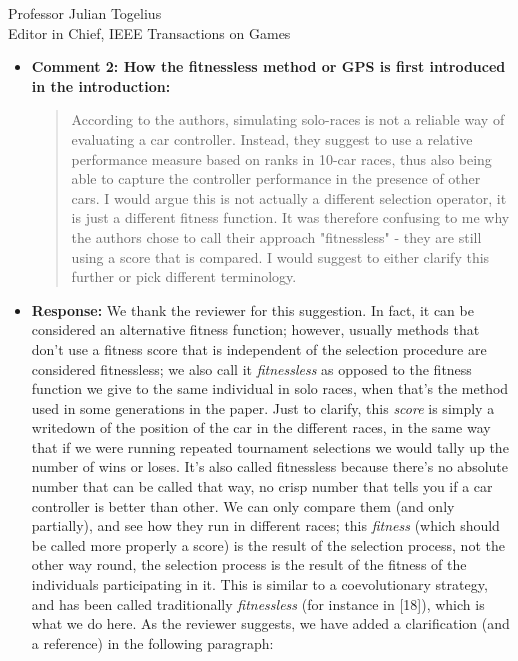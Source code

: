 \documentclass[10pt]{letter} %
\begin{document}
\begin{letter}{Professor Julian Togelius \\ Editor in Chief, IEEE Transactions on Games}
\begin{enumerate}
\begin{itemize}
		\item {\bf  Comment 2:  How the fitnessless method or GPS is first introduced in the introduction:\\
			                \begin{quote}
				According to the authors, simulating solo-races is
				not a reliable way of evaluating a car
				controller. Instead, they suggest to use a relative
				performance measure based on ranks in 10-car races,
				thus also being able to capture the controller
				performance in the presence of other cars. I would
				argue this is not actually a different selection
				operator, it is just a different fitness function. It
				was therefore confusing to me why the authors chose
				to call their approach "fitnessless" - they are still
				using a score that is compared. I would suggest to
				either clarify this further or pick different
				terminology.
			\end{quote}}
			\item {\bf Response:}
		We thank the reviewer for this suggestion. In fact, it can be
		considered an alternative fitness function; however, usually methods that don't use a fitness score that is independent of the selection procedure are considered fitnessless; we also call it {\em fitnessless} as opposed to the fitness function we give to the same individual in solo races, when that's the method used in some generations in the paper. Just to clarify, this {\em score} is simply a writedown of the position of the car in the different races, in the
		same way that if we were running repeated tournament selections we would tally up the number of wins or loses. It's also called fitnessless because there's no absolute number that can be called that way, no crisp number that tells you if a car controller is better than other. We can only compare them (and only partially), and see how they
		run in different races; this {\em fitness} (which should be called more properly a score) is the result of the selection process, not the other way round, the selection process is the result of the fitness of the individuals participating in it. This is similar to a coevolutionary strategy, and has been called traditionally {\em fitnessless} (for instance in [18]), which is what we do here.
		As the reviewer suggests, we have added a clarification (and a
		reference) in the following paragraph:\\

\end{itemize}
\end{enumerate}
\end{letter}
\end{document}
